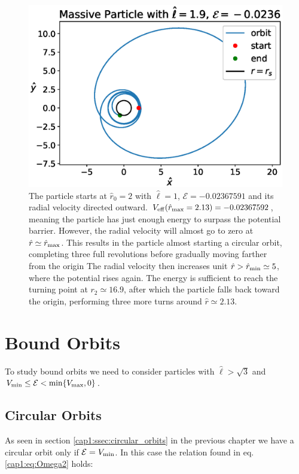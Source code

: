 \begin{figure}[h!]
    \centering
    \includegraphics[width=0.73 \textwidth]{Figures/chapter2/volevi.eps}
    \caption{The particle starts at $\hat r_0 = 2$ with $\hat \ell = 1$,
    $\mathcal E = -0.02367591$ and its radial velocity directed outward.
    $V_{\rm eff} (\hat r_{\rm max} = 2.13) = -0.02367592$, meaning the particle
    has just enough energy to surpass the potential barrier.
    However, the radial velocity will almost go to zero at
    $\hat r \simeq \hat r_{\rm max}$.
    This results in the particle almost starting a circular orbit, completing
    three full revolutions before gradually moving farther from the origin
    The radial velocity then increases unit
    $\hat r > \hat r_{\rm min} \simeq 5$, where the potential rises again.
    The energy is sufficient to reach the turning point at $r_2 \simeq 16.9$,
    after which the particle falls back toward the origin, performing three more
    turns around $\hat r \simeq 2.13$.}
    \label{cap2:fig:volevi}
\end{figure}


\section{Bound Orbits}

To study bound orbits we need to consider particles with $\hat \ell > \sqrt{3}$
and $V_{\rm min} \leq \mathcal E < \min \{V_{\rm max}, 0\}$.

\subsection{Circular Orbits}

As seen in section \ref{cap1:ssec:circular_orbits} in the previous chapter we
have a circular orbit only if $\mathcal E = V_{\rm min}$.
In this case the relation found in eq. \ref{cap1:eq:Omega2} holds:

